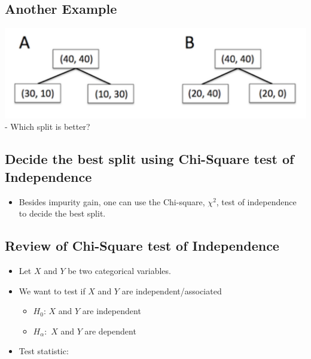 \documentclass[
]{article}
\providecommand{\tightlist}{%
  \setlength{\itemsep}{0pt}\setlength{\parskip}{0pt}}
\begin{document}
\hypertarget{another-example}{%
\subsection{Another Example}\label{another-example}}

\includegraphics{images/i1.png} - Which split is better?

\hypertarget{decide-the-best-split-using-chi-square-test-of-independence}{%
\subsection{Decide the best split using Chi-Square test of
Independence}\label{decide-the-best-split-using-chi-square-test-of-independence}}

\begin{itemize}
\tightlist
\item
  Besides impurity gain, one can use the Chi-square, \(\chi^2\), test of
  independence to decide the best split.
\end{itemize}

\hypertarget{review-of-chi-square-test-of-independence}{%
\subsection{Review of Chi-Square test of
Independence}\label{review-of-chi-square-test-of-independence}}

\begin{itemize}
\tightlist
\item
  Let \(X\) and \(Y\) be two categorical variables.
\item
  We want to test if \(X\) and \(Y\) are independent/associated

  \begin{itemize}
  \tightlist
  \item
    \(H_0\): \(X\) and \(Y\) are independent
  \item
    \(H_{\alpha}:\) \(X\) and \(Y\) are dependent
  \end{itemize}
\item
  Test statistic:
\end{itemize}
\end{document}

